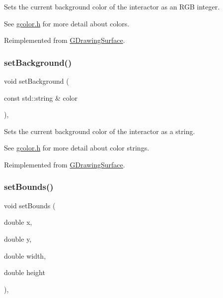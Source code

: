 Sets the current background color of the interactor as an R\+GB integer. 

See \mbox{\hyperlink{gcolor_8h_source}{gcolor.\+h}} for more detail about colors. 

Reimplemented from \mbox{\hyperlink{classGDrawingSurface_aba673fd56570a074aba10fa059524b96}{G\+Drawing\+Surface}}.

\mbox{\label{classGCanvas_a9cb99695b93494c7ba28268ce9e42c2a}} 
\subsubsection{\texorpdfstring{set\+Background()}{setBackground()}\hspace{0.1cm}{\footnotesize\ttfamily [2/2]}}
{\footnotesize\ttfamily void set\+Background (\begin{DoxyParamCaption}\item[{const std\+::string \&}]{color }\end{DoxyParamCaption})\hspace{0.3cm}{\ttfamily [override]}, {\ttfamily [virtual]}}



Sets the current background color of the interactor as a string. 

See \mbox{\hyperlink{gcolor_8h_source}{gcolor.\+h}} for more detail about color strings. 

Reimplemented from \mbox{\hyperlink{classGDrawingSurface_ab4677ab2474e68b07aa56605af92a84a}{G\+Drawing\+Surface}}.

\mbox{\label{classGInteractor_a2aae8197624b72265ab83b4f1bc73f2f}} 
\subsubsection{\texorpdfstring{set\+Bounds()}{setBounds()}\hspace{0.1cm}{\footnotesize\ttfamily [1/2]}}
{\footnotesize\ttfamily void set\+Bounds (\begin{DoxyParamCaption}\item[{double}]{x,  }\item[{double}]{y,  }\item[{double}]{width,  }\item[{double}]{height }\end{DoxyParamCaption})\hspace{0.3cm}{\ttfamily [virtual]}, {\ttfamily [inherited]}}



